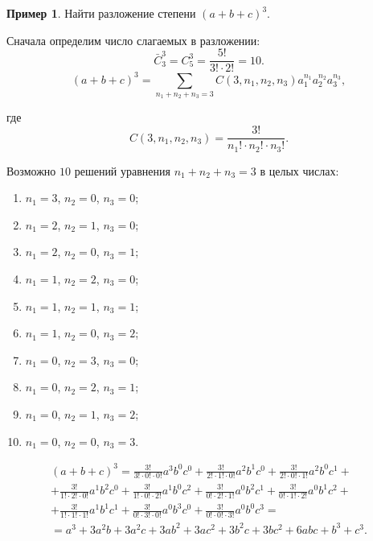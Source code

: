 \documentclass[a5paper, 11pt]{extarticle}
\theoremstyle{definition}
\newtheorem{example}{Пример}[subsection]
\theoremstyle{definition}
\theoremstyle{definition}
\numberwithin{figure}{section}
\numberwithin{table}{section}
\begin{document}
\begin{example}
    Найти разложение степени \((a + b + c)^3\).

    Сначала определим число слагаемых в разложении:
    \[
        \bar{C}_3^3 = C_5^3 = \frac{5!}{3! \cdot 2!} = 10.
    \]
    \[
        (a + b + c)^3 = \sum_{n_1 + n_2 + n_3 = 3} C(3, n_1, n_2, n_3) a_1^{n_1} a_2^{n_2} a_3^{n_3},
    \]

    где
    \[
        C(3, n_1, n_2, n_3) = \frac{3!}{n_1! \cdot n_2! \cdot n_3!}.
    \]

    Возможно \(10\) решений уравнения \(n_1 + n_2 + n_3 = 3\) в целых числах:
    \begin{multicols}{2}
        \begin{enumerate}
            \item \(n_1 = 3\), \(n_2 = 0\), \(n_3 = 0\);
            \item \(n_1 = 2\), \(n_2 = 1\), \(n_3 = 0\);
            \item \(n_1 = 2\), \(n_2 = 0\), \(n_3 = 1\);
            \item \(n_1 = 1\), \(n_2 = 2\), \(n_3 = 0\);
            \item \(n_1 = 1\), \(n_2 = 1\), \(n_3 = 1\);
        \end{enumerate}
        \begin{enumerate}
            \setcounter{enumi}{5}
            \item \(n_1 = 1\), \(n_2 = 0\), \(n_3 = 2\);
            \item \(n_1 = 0\), \(n_2 = 3\), \(n_3 = 0\);
            \item \(n_1 = 0\), \(n_2 = 2\), \(n_3 = 1\);
            \item \(n_1 = 0\), \(n_2 = 1\), \(n_3 = 2\);
            \item \(n_1 = 0\), \(n_2 = 0\), \(n_3 = 3\).
        \end{enumerate}
    \end{multicols}

    \begin{gather*}
        (a + b + c)^3 =
        \frac{3!}{3! \cdot 0! \cdot 0!} a^3 b^0 c^0 + \frac{3!}{2! \cdot 1! \cdot 0!} a^2 b^1 c^0 + \frac{3!}{2! \cdot 0! \cdot 1!} a^2 b^0 c^1 + \\ + \frac{3!}{1! \cdot 2! \cdot 0!} a^1 b^2 c^0 + \frac{3!}{1! \cdot 0! \cdot 2!} a^1 b^0 c^2 + \frac{3!}{0! \cdot 2! \cdot 1!} a^0 b^2 c^1 + \frac{3!}{0! \cdot 1! \cdot 2!} a^0 b^1 c^2 + \\ + \frac{3!}{1! \cdot 1! \cdot 1!} a^1 b^1 c^1 + \frac{3!}{0! \cdot 3! \cdot 0!} a^0 b^3 c^0 + \frac{3!}{0! \cdot 0! \cdot 3!} a^0 b^0 c^3 = \\ =
        a^3 + 3 a^2 b + 3 a^2 c + 3 a b^2 + 3 a c^2 + 3 b^2 c + 3 b c^2 + 6 a b c + b^3 + c^3.
    \end{gather*}
\end{example}
\end{document}
